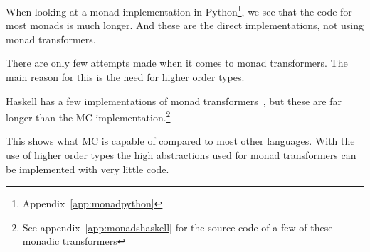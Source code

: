When looking at a monad implementation in Python\footnote{Appendix~\ref{app:monadpython}}, we see that the code for most monads is much longer.
And these are the direct implementations, not using monad transformers.

There are only few attempts made when it comes to monad transformers.
The main reason for this is the need for higher order types.

Haskell has a few implementations of monad transformers~\cite{monadshaskell}, but these are far longer than the MC implementation.\footnote{See appendix~\ref{app:monadshaskell} for the source code of a few of these monadic transformers}

This shows what MC is capable of compared to most other languages.
With the use of higher order types the high abstractions used for monad transformers can be implemented with very little code.



